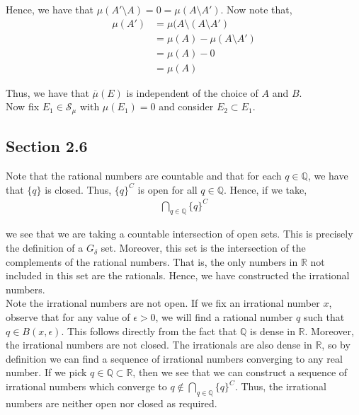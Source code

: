 \documentclass[12pt]{article}
\newenvironment{problem}[2][Problem]{\begin{trivlist}
\item[\hskip \labelsep {\bfseries #1}\hskip \labelsep {\bfseries #2.}]}{\end{trivlist}}
\begin{document}
Hence, we have that $\mu(A' \setminus A) = 0 = \mu(A \setminus A')$. Now note that,
\begin{align*}
\mu(A') &= \mu(A \setminus (A \setminus A')\\
&= \mu(A) - \mu(A \setminus A')\\
&= \mu(A) - 0\\
&= \mu(A)
\end{align*}

Thus, we have that $\overline{\mu}(E)$ is independent of the choice of $A$ and $B$.\\

Now fix $E_1 \in \mathcal{S}_{\mu}$ with $\mu(E_1) = 0$ and consider $E_2 \subset E_1$.

\subsection{Section 2.6}

\begin{problem}{2}
\end{problem}

Note that the rational numbers are countable and that for each $q \in \mathbb{Q}$, we have that $\{q\}$ is closed. Thus, $\{q\}^C$ is open for all $q \in \mathbb{Q}$. Hence, if we take,
\begin{align*}
\bigcap_{q \in \mathbb{Q}} \{q\}^C
\end{align*}

we see that we are taking a countable intersection of open sets. This is precisely the definition of a $G_{\delta}$ set. Moreover, this set is the intersection of the complements of the rational numbers. That is, the only numbers in $\mathbb{R}$ not included in this set are the rationals. Hence, we have constructed the irrational numbers.\\

Note the irrational numbers are not open. If we fix an irrational number $x$, observe that for any value of $\epsilon > 0$, we will find a rational number $q$ such that $q \in B(x, \epsilon)$. This follows directly from the fact that $\mathbb{Q}$ is dense in $\mathbb{R}$. Moreover, the irrational numbers are not closed. The irrationals are also dense in $\mathbb{R}$, so by definition we can find a sequence of irrational numbers converging to any real number. If we pick $q \in \mathbb{Q} \subset \mathbb{R}$, then we see that we can construct a sequence of irrational numbers which converge to $q \not\in \bigcap_{q \in \mathbb{Q}} \{q\}^C$. Thus, the irrational numbers are neither open nor closed as required.
\end{document}
